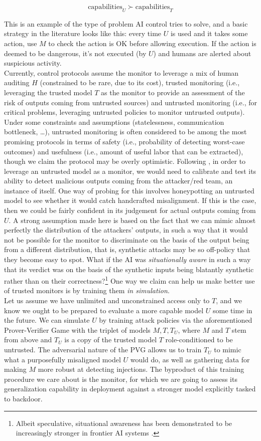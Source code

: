 $$\text{capabilities}_U \succ \text{capabilities}_T$$

This is an example of the type of problem AI control tries to solve, and a basic strategy in the literature \citep{greenblatt2023ai} looks like this: every time $U$ is used and it takes some action, use $M$ to check the action is OK before allowing execution. If the action is deemed to be dangerous, it's not executed (by $U$) and humans are alerted about suspicious activity.
\\
Currently, control protocols assume the monitor to leverage a mix of human auditing $H$ (constrained to be rare, due to its cost), trusted monitoring (i.e., leveraging the trusted model $T$ as the monitor to provide an assessment of the risk of outputs coming from untrusted sources) and untrusted monitoring (i.e., for critical problems, leveraging untrusted policies to monitor untrusted outputs). Under some constraints and assumptions (statelessness, communication bottleneck, …), untrusted monitoring is often considered to be among the most promising protocols in terms of safety (i.e., probability of detecting worst-case outcomes) and usefulness (i.e., amount of useful labor that can be extracted), though we claim the protocol may be overly optimistic. Following \citet{greenblatt2023ai}, in order to leverage an untrusted model as a monitor, we would need to calibrate and test its ability to detect malicious outputs coming from the attacker/red team, an instance of itself. One way of probing for this involves honeypotting an untrusted model to see whether it would catch handcrafted misalignment. If this is the case, then we could be fairly confident in its judgement for actual outputs coming from $U$. A strong assumption made here is based on the fact that we can mimic almost perfectly the distribution of the attackers' outputs, in such a way that it would not be possible for the monitor to discriminate on the basis of the output being from a different distribution, that is, synthetic attacks may be so off-policy that they become easy to spot. What if the AI was \emph{situationally aware} in such a way that its verdict was on the basis of the synthetic inputs being blatantly synthetic rather than on their correctness?\footnote{Albeit speculative, situational awareness has been demonstrated to be increasingly stronger in frontier AI systems \citep{meinke2024frontier}.}
One way we claim can help us make better use of trusted monitors is by training them \emph{in simulation}.\\
Let us assume we have unlimited and unconstrained access only to $T$, and we know we ought to be prepared to evaluate a more capable model $U$ some time in the future. We can simulate $U$ by training attack policies via the aforementioned Prover-Verifier Game with the triplet of models $M, T, T_U$, where $M$ and $T$ stem from above and $T_U$ is a copy of the trusted model $T$ role-conditioned to be untrusted. The adversarial nature of the PVG allows us to train $T_U$ to mimic what a purposefully misaligned model $U$ would do, as well as gathering data for making $M$ more robust at detecting injections. The byproduct of this training procedure we care about is the monitor, for which we are going to assess its generalization capability in deployment against a stronger model explicitly tasked to backdoor. 
